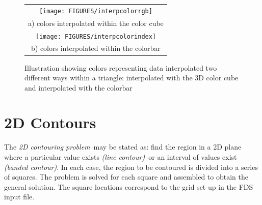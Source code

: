 \documentclass[11pt,twoside]{book}
\begin{document}
\begin{figure}[\figoptions]
\begin{center}
\begin{tabular}{c}
\texttt{[image: FIGURES/interpcolorrgb]}\\
a) colors interpolated within the color cube\\
\texttt{[image: FIGURES/interpcolorindex]}\\
b) colors interpolated within the colorbar\\
\end{tabular}
\end{center}
\caption[Color interpolation examples]
{Illustration showing colors representing data interpolated two different ways within a triangle: interpolated with the 3D color cube and interpolated with the colorbar}
\label{colorinterp}%
\end{figure}

%
%

\section{2D Contours}

The {\em 2D contouring problem}\ may be stated as: find the region in a 2D plane where a particular value exists {\em (line contour)}\ or an interval of values exist {\em (banded contour)}.   In each case, the  region to be contoured is divided into a series of squares.  The problem is solved for each square and assembled to obtain the general solution.  The square locations correspond to the grid set up in the FDS input file.
\end{document}
